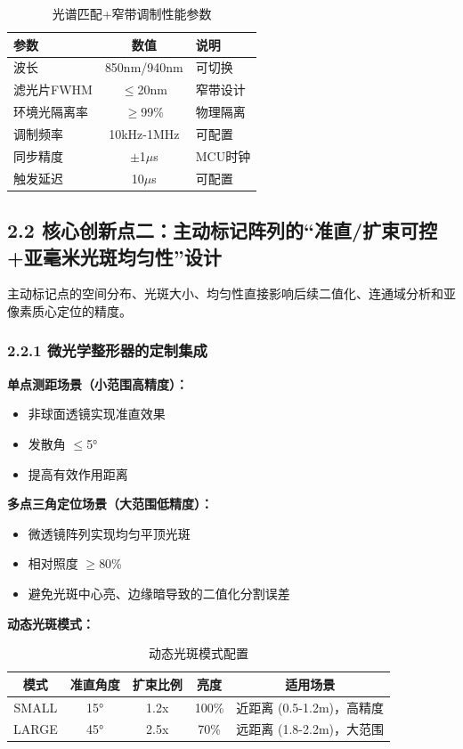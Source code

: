 \documentclass[12pt,a4paper]{article}
\begin{document}
\begin{table}[H]
\centering
\caption{光谱匹配+窄带调制性能参数}
\begin{tabular}{lcl}
\toprule
参数 & 数值 & 说明 \\
\midrule
波长 & 850nm/940nm & 可切换 \\
滤光片FWHM & $\le$20nm & 窄带设计 \\
环境光隔离率 & $\ge$99\% & 物理隔离 \\
调制频率 & 10kHz-1MHz & 可配置 \\
同步精度 & $\pm$1$\mu$s & MCU时钟 \\
触发延迟 & 10$\mu$s & 可配置 \\
\bottomrule
\end{tabular}
\end{table}

\subsection{2.2 核心创新点二：主动标记阵列的``准直/扩束可控+亚毫米光斑均匀性''设计}

主动标记点的空间分布、光斑大小、均匀性直接影响后续二值化、连通域分析和亚像素质心定位的精度。

\subsubsection{2.2.1 微光学整形器的定制集成}

\textbf{单点测距场景（小范围高精度）：}
\begin{itemize}
\item 非球面透镜实现准直效果
\item 发散角 $\le$5°
\item 提高有效作用距离
\end{itemize}

\textbf{多点三角定位场景（大范围低精度）：}
\begin{itemize}
\item 微透镜阵列实现均匀平顶光斑
\item 相对照度 $\ge$80\%
\item 避免光斑中心亮、边缘暗导致的二值化分割误差
\end{itemize}

\textbf{动态光斑模式：}

\begin{table}[H]
\centering
\caption{动态光斑模式配置}
\begin{tabular}{ccccc}
\toprule
模式 & 准直角度 & 扩束比例 & 亮度 & 适用场景 \\
\midrule
SMALL & 15° & 1.2x & 100\% & 近距离 (0.5-1.2m)，高精度 \\
LARGE & 45° & 2.5x & 70\% & 远距离 (1.8-2.2m)，大范围 \\
\bottomrule
\end{tabular}
\end{table}
\end{document}
